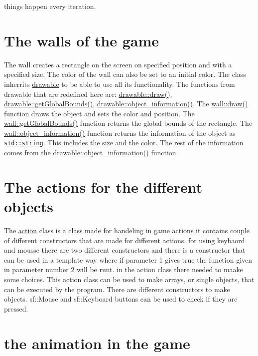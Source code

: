 things happen every iteration.\hypertarget{index_wall}{}\section{The walls of the game}\label{index_wall}
The wall creates a rectangle on the screen on specified position and with a specified size. The color of the wall can also be set to an initial color. The class inherrits \hyperlink{classdrawable}{drawable} to be able to use all its functionality. The functions from drawable that are redefined here are\+: \hyperlink{classdrawable_a4e49e2c1121704c83ce24c5f48dd910f}{drawable\+::draw()}, \hyperlink{classdrawable_ae013ac0be47538be9ce885d6642daf73}{drawable\+::get\+Global\+Bounds()}, \hyperlink{classdrawable_a2ed0f8bb53f33477f7722efa7bb24583}{drawable\+::object\+\_\+information()}. The \hyperlink{classwall_aa25b8377e1d9a209fabd2271294f05d0}{wall\+::draw()} function draws the object and sets the color and position. The \hyperlink{classwall_a317a464c879cfdf9464bd6f1b62d9101}{wall\+::get\+Global\+Bounds()} function returns the global bounds of the rectangle. The \hyperlink{classwall_aab1de4f144f176b134a967ba08747932}{wall\+::object\+\_\+information()} function returns the information of the object as \href{http://www.cplusplus.com/reference/string/string/string/}{\tt std\+::string}. This includes the size and the color. The rest of the information comes from the \hyperlink{classdrawable_a2ed0f8bb53f33477f7722efa7bb24583}{drawable\+::object\+\_\+information()} function.\hypertarget{index_actions}{}\section{The actions for the different objects}\label{index_actions}
The \hyperlink{classaction}{action} class is a class made for handeling in game actions it contains couple of different constructors that are made for different actions. for using keybaord and mousse there are two different constructors and there is a constructor that can be used in a template way where if parameter 1 gives true the function given in parameter number 2 will be runt. in the action class there needed to maake some choices. This action class can be used to make arrays, or single objects, that can be executed by the program. There are different constructors to make objects. sf\+::\+Mouse and sf\+::\+Keyboard buttons can be used to check if they are pressed.\hypertarget{index_animation}{}\section{the animation in the game}\label{index_animation}
